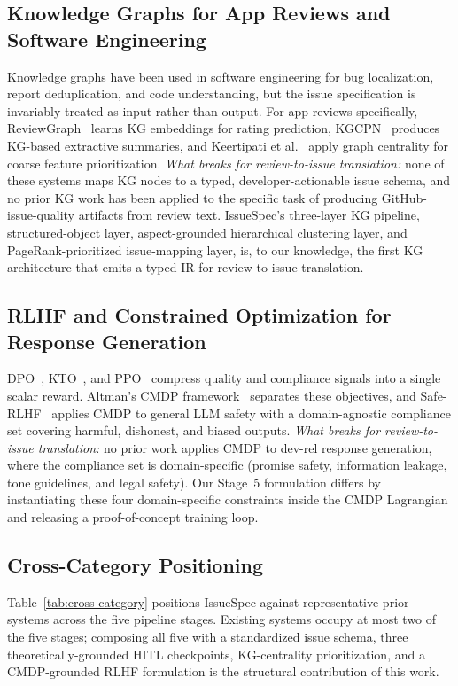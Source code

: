 \documentclass[preprint,12pt]{elsarticle}
\begin{document}
\subsection{Knowledge Graphs for App Reviews and Software Engineering}
Knowledge graphs have been used in software engineering for bug localization, report deduplication, and code understanding, but the issue specification is invariably treated as input rather than output. For app reviews specifically, ReviewGraph~\cite{de2025reviewgraph} learns KG embeddings for rating prediction, KGCPN~\cite{yu2024knowledge} produces KG-based extractive summaries, and Keertipati et al.~\cite{keertipati2016approaches} apply graph centrality for coarse feature prioritization. \emph{What breaks for review-to-issue translation:} none of these systems maps KG nodes to a typed, developer-actionable issue schema, and no prior KG work has been applied to the specific task of producing GitHub-issue-quality artifacts from review text. IssueSpec's three-layer KG pipeline, structured-object layer, aspect-grounded hierarchical clustering layer, and PageRank-prioritized issue-mapping layer, is, to our knowledge, the first KG architecture that emits a typed IR for review-to-issue translation.

\subsection{RLHF and Constrained Optimization for Response Generation}
DPO~\cite{rafailov2023direct}, KTO~\cite{ethayarajh2024kto}, and PPO~\cite{schulman2017proximal} compress quality and compliance signals into a single scalar reward. Altman's CMDP framework~\cite{altman2021constrained} separates these objectives, and Safe-RLHF~\cite{dai2024safe} applies CMDP to general LLM safety with a domain-agnostic compliance set covering harmful, dishonest, and biased outputs. \emph{What breaks for review-to-issue translation:} no prior work applies CMDP to dev-rel response generation, where the compliance set is domain-specific (promise safety, information leakage, tone guidelines, and legal safety). Our Stage~5 formulation differs by instantiating these four domain-specific constraints inside the CMDP Lagrangian and releasing a proof-of-concept training loop.

\subsection{Cross-Category Positioning}
Table~\ref{tab:cross-category} positions IssueSpec against representative prior systems across the five pipeline stages. Existing systems occupy at most two of the five stages; composing all five with a standardized issue schema, three theoretically-grounded HITL checkpoints, KG-centrality prioritization, and a CMDP-grounded RLHF formulation is the structural contribution of this work.
\end{document}
